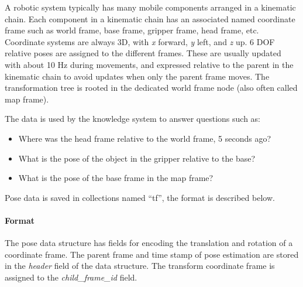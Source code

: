 
A robotic system typically has many mobile components arranged in a kinematic chain.
Each component in a kinematic chain has an associated named coordinate frame such as
world frame, base frame, gripper frame, head frame, etc.
Coordinate systems are always 3D, with \emph{x} forward, \emph{y} left, and \emph{z} up.
6 DOF relative poses are assigned to the different frames.
These are usually updated with about 10 Hz during movements, and
expressed relative to the 
parent in the kinematic chain to avoid updates when only the parent frame moves.
The transformation tree is rooted in the dedicated world frame node
(also often called map frame).

The data is used by the \ease knowledge system to answer questions such as:
\begin{itemize}
 \item Where was the head frame relative to the world frame, 5 seconds ago?
 \item What is the pose of the object in the gripper relative to the base?
 \item What is the pose of the base frame in the map frame? 
\end{itemize}


Pose data is saved in \mongodb collections named ``tf'', the format is described below.

\paragraph{Format}
The pose data structure has
fields for encoding the translation and rotation of a coordinate frame.
The parent frame and time stamp of pose estimation
are stored in the \emph{header} field of the data structure.
The transform coordinate frame is assigned to the \emph{child\_frame\_id} field. \\


